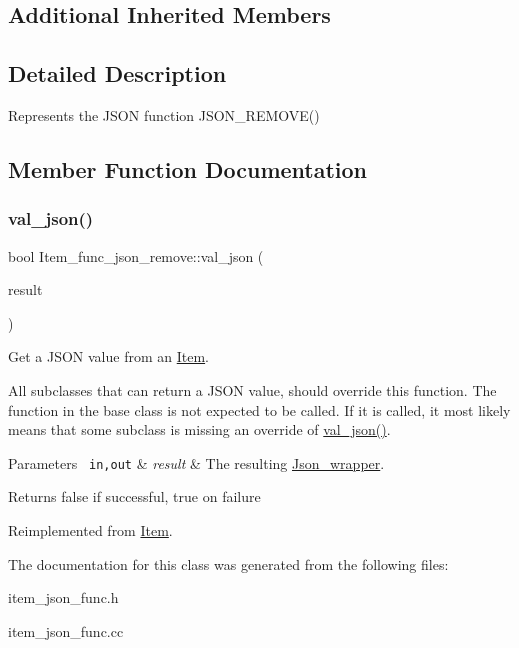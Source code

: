 \subsection*{Additional Inherited Members}


\subsection{Detailed Description}
Represents the J\+S\+ON function J\+S\+O\+N\+\_\+\+R\+E\+M\+O\+V\+E() 

\subsection{Member Function Documentation}
\mbox{\label{classItem__func__json__remove_a54cf17d640b8f52c375b5456341049af}} 
\subsubsection{\texorpdfstring{val\+\_\+json()}{val\_json()}}
{\footnotesize\ttfamily bool Item\+\_\+func\+\_\+json\+\_\+remove\+::val\+\_\+json (\begin{DoxyParamCaption}\item[{\mbox{\hyperlink{classJson__wrapper}{Json\+\_\+wrapper}} $\ast$}]{result }\end{DoxyParamCaption})\hspace{0.3cm}{\ttfamily [virtual]}}

Get a J\+S\+ON value from an \mbox{\hyperlink{classItem}{Item}}.

All subclasses that can return a J\+S\+ON value, should override this function. The function in the base class is not expected to be called. If it is called, it most likely means that some subclass is missing an override of \mbox{\hyperlink{classItem__func__json__remove_a54cf17d640b8f52c375b5456341049af}{val\+\_\+json()}}.


\begin{DoxyParams}[1]{Parameters}
\mbox{\texttt{ in,out}}  & {\em result} & The resulting \mbox{\hyperlink{classJson__wrapper}{Json\+\_\+wrapper}}.\\
\hline
\end{DoxyParams}
\begin{DoxyReturn}{Returns}
false if successful, true on failure 
\end{DoxyReturn}


Reimplemented from \mbox{\hyperlink{classItem_a57e763fcde2d0a819d21e31c59611290}{Item}}.



The documentation for this class was generated from the following files\+:\begin{DoxyCompactItemize}
\item 
item\+\_\+json\+\_\+func.\+h\item 
item\+\_\+json\+\_\+func.\+cc\end{DoxyCompactItemize}
